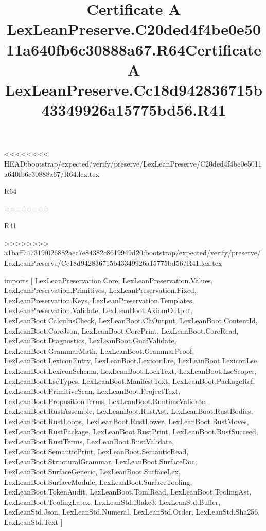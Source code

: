 <<<<<<<< HEAD:bootstrap/expected/verify/preserve/LexLeanPreserve/C20ded4f4be0e5011a640fb6c30888a67/R64.lex.tex
\begin{lexlean}{R64}
\title{Certificate A LexLeanPreserve.C20ded4f4be0e5011a640fb6c30888a67.R64}
========
\begin{lexlean}{R41}
\title{Certificate A LexLeanPreserve.Cc18d942836715b43349926a15775bd56.R41}
>>>>>>>> a1baff747319f026882aec7e84382c8619949d20:bootstrap/expected/verify/preserve/LexLeanPreserve/Cc18d942836715b43349926a15775bd56/R41.lex.tex
\begin{coremodule}
imports [
  LexLeanPreservation.Core,
  LexLeanPreservation.Values,
  LexLeanPreservation.Primitives,
  LexLeanPreservation.Fixed,
  LexLeanPreservation.Keys,
  LexLeanPreservation.Templates,
  LexLeanPreservation.Validate,
  LexLeanBoot.AxiomOutput,
  LexLeanBoot.CalculusCheck,
  LexLeanBoot.CliOutput,
  LexLeanBoot.ContentId,
  LexLeanBoot.CoreJson,
  LexLeanBoot.CorePrint,
  LexLeanBoot.CoreRead,
  LexLeanBoot.Diagnostics,
  LexLeanBoot.GnafValidate,
  LexLeanBoot.GrammarMath,
  LexLeanBoot.GrammarProof,
  LexLeanBoot.LexiconEntry,
  LexLeanBoot.LexiconLre,
  LexLeanBoot.LexiconLse,
  LexLeanBoot.LexiconSchema,
  LexLeanBoot.LockText,
  LexLeanBoot.LseScopes,
  LexLeanBoot.LseTypes,
  LexLeanBoot.ManifestText,
  LexLeanBoot.PackageRef,
  LexLeanBoot.PrimitiveScan,
  LexLeanBoot.ProjectText,
  LexLeanBoot.PropositionTerms,
  LexLeanBoot.RuntimeValidate,
  LexLeanBoot.RustAssemble,
  LexLeanBoot.RustAst,
  LexLeanBoot.RustBodies,
  LexLeanBoot.RustLoops,
  LexLeanBoot.RustLower,
  LexLeanBoot.RustMoves,
  LexLeanBoot.RustPackage,
  LexLeanBoot.RustPrint,
  LexLeanBoot.RustSucceed,
  LexLeanBoot.RustTerms,
  LexLeanBoot.RustValidate,
  LexLeanBoot.SemanticPrint,
  LexLeanBoot.SemanticRead,
  LexLeanBoot.StructuralGrammar,
  LexLeanBoot.SurfaceDoc,
  LexLeanBoot.SurfaceGeneric,
  LexLeanBoot.SurfaceLex,
  LexLeanBoot.SurfaceModule,
  LexLeanBoot.SurfaceTooling,
  LexLeanBoot.TokenAudit,
  LexLeanBoot.TomlRead,
  LexLeanBoot.ToolingAst,
  LexLeanBoot.ToolingLatex,
  LexLeanStd.Blake3,
  LexLeanStd.Buffer,
  LexLeanStd.Json,
  LexLeanStd.Numeral,
  LexLeanStd.Order,
  LexLeanStd.Sha256,
  LexLeanStd.Text
]


\end{coremodule}
\end{lexlean}
\end{lexlean}

